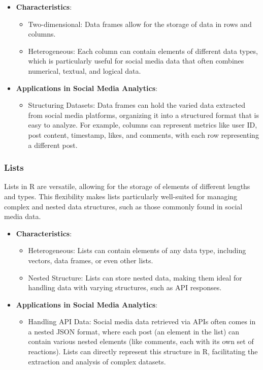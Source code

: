 \documentclass[
]{book}
\providecommand{\tightlist}{%
  \setlength{\itemsep}{0pt}\setlength{\parskip}{0pt}}
\begin{document}
\begin{itemize}
\tightlist
\item
  \textbf{Characteristics}:

  \begin{itemize}
  \tightlist
  \item
    Two-dimensional: Data frames allow for the storage of data in rows and columns.
  \item
    Heterogeneous: Each column can contain elements of different data types, which is particularly useful for social media data that often combines numerical, textual, and logical data.
  \end{itemize}
\item
  \textbf{Applications in Social Media Analytics}:

  \begin{itemize}
  \tightlist
  \item
    Structuring Datasets: Data frames can hold the varied data extracted from social media platforms, organizing it into a structured format that is easy to analyze. For example, columns can represent metrics like user ID, post content, timestamp, likes, and comments, with each row representing a different post.
  \end{itemize}
\end{itemize}

\hypertarget{lists-1}{%
\subsubsection{Lists}\label{lists-1}}

Lists in R are versatile, allowing for the storage of elements of different lengths and types. This flexibility makes lists particularly well-suited for managing complex and nested data structures, such as those commonly found in social media data.

\begin{itemize}
\tightlist
\item
  \textbf{Characteristics}:

  \begin{itemize}
  \tightlist
  \item
    Heterogeneous: Lists can contain elements of any data type, including vectors, data frames, or even other lists.
  \item
    Nested Structure: Lists can store nested data, making them ideal for handling data with varying structures, such as API responses.
  \end{itemize}
\item
  \textbf{Applications in Social Media Analytics}:

  \begin{itemize}
  \tightlist
  \item
    Handling API Data: Social media data retrieved via APIs often comes in a nested JSON format, where each post (an element in the list) can contain various nested elements (like comments, each with its own set of reactions). Lists can directly represent this structure in R, facilitating the extraction and analysis of complex datasets.
  \end{itemize}
\end{itemize}
\end{document}
